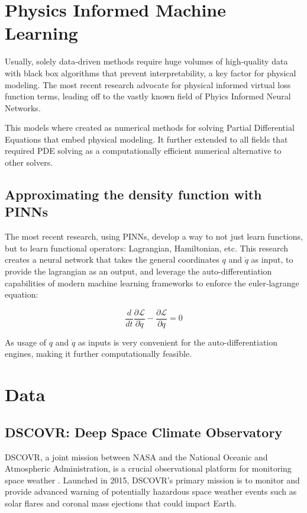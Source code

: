 \documentclass[12pt]{article}
\begin{document}
\section{Physics Informed Machine Learning}
Usually, solely data-driven methods require huge volumes of high-quality data with black box algorithms that prevent interpretability, a key factor for physical modeling. The most recent research \cite{PINNS} advocate for physical informed virtual loss function terms, leading off to the vastly known field of Phyics Informed Neural Networks.

This models where created as numerical methods for solving Partial Differential Equations that embed physical modeling. It further extended to all fields that required PDE solving as a computationally efficient numerical alternative to other solvers.


\subsection{Approximating the density function with PINNs}
The most recent research, using PINNs, develop a way to not just learn functions, but to learn functional operators: Lagrangian, Hamiltonian, etc. This research \cite{} creates a neural network that takes the general coordinates $q$ and $\dot q$ as input, to provide the lagrangian as an output, and leverage the auto-differentiation capabilities of modern machine learning frameworks to enforce the euler-lagrange equation:

\begin{equation}
    \frac{d}{dt} \frac{\partial \mathcal{L}}{\partial \dot q} - \frac{\partial \mathcal{L}}{\partial q} = 0
\end{equation}

As usage of $q$ and $\dot q$ as inputs is very convenient for the auto-differentiation engines, making it further computationally feasible.

\section{Data}

\subsection{DSCOVR: Deep Space Climate Observatory}
DSCOVR, a joint mission between NASA and the National Oceanic and Atmospheric Administration, is a crucial observational platform for monitoring space weather \cite{nasa_dscovr}. Launched in 2015, DSCOVR's primary mission is to monitor and provide advanced warning of potentially hazardous space weather events such as solar flares and coronal mass ejections that could impact Earth.
\end{document}

